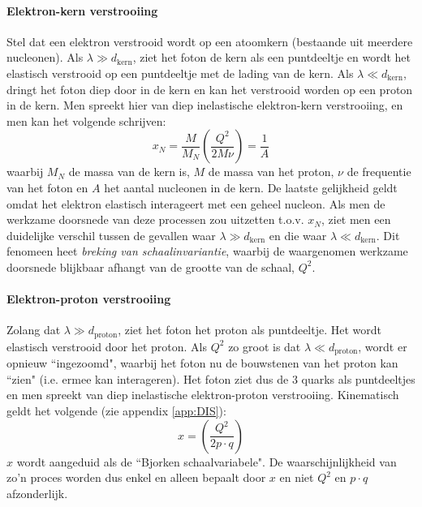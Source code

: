 \documentclass[a4paper,11pt]{article}
\numberwithin{equation}{section} %
\begin{document}
    \paragraph{Elektron-kern verstrooiing}
Stel dat een elektron verstrooid wordt op een atoomkern (bestaande uit meerdere nucleonen).
Als $\lambda \gg d_\text{kern}$, ziet het foton de kern als een puntdeeltje en wordt het elastisch verstrooid op een puntdeeltje met de lading van de kern.
Als $\lambda \ll d_\text{kern}$, dringt het foton diep door in de kern en kan het verstrooid worden op een proton in de kern.
Men spreekt hier van diep inelastische elektron-kern verstrooiing, en men kan het volgende schrijven:
\begin{equation}
x_N = \frac{M}{M_N} \left( \frac{Q^2}{2M\nu} \right) = \frac{1}{A}
\end{equation}
waarbij $M_N$ de massa van de kern is, $M$ de massa van het proton, $\nu$ de frequentie van het foton en $A$ het aantal nucleonen in de kern.
De laatste gelijkheid geldt omdat het elektron elastisch interageert met een geheel nucleon.
Als men de werkzame doorsnede van deze processen zou uitzetten t.o.v. $x_N$, ziet men een duidelijke verschil tussen de gevallen waar $\lambda \gg d_\text{kern}$ en die waar $\lambda \ll d_\text{kern}$.
Dit fenomeen heet \textit{breking van schaalinvariantie}, waarbij de waargenomen werkzame doorsnede blijkbaar afhangt van de grootte van de schaal, $Q^2$.

      \paragraph{Elektron-proton verstrooiing}
Zolang dat $\lambda \gg d_\text{proton}$, ziet het foton het proton als puntdeeltje. Het wordt elastisch verstrooid door het proton.
Als $Q^2$ zo groot is dat $\lambda \ll d_\text{proton}$, wordt er opnieuw ``ingezoomd", waarbij het foton nu de bouwstenen van het proton kan “zien" (i.e. ermee kan interageren).
Het foton ziet dus de 3 quarks als puntdeeltjes en men spreekt van diep inelastische elektron-proton verstrooiing.
Kinematisch geldt het volgende (zie appendix \ref{app:DIS}):
\begin{equation} \label{eq:Bjorkenx}
x = \left( \frac{Q^2}{2p\cdot q} \right)
\end{equation}
$x$ wordt aangeduid als de “Bjorken schaalvariabele".
De waarschijnlijkheid van zo'n proces worden dus enkel en alleen bepaalt door $x$ en niet $Q^2$ en $p\cdot q$ afzonderlijk.
\end{document}
